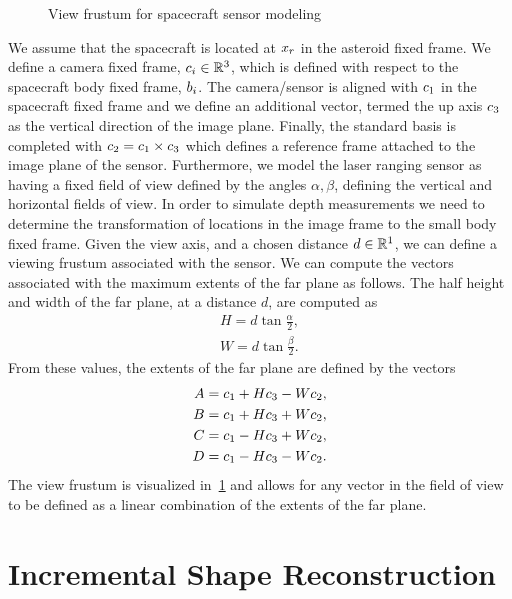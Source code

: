 \documentclass[letterpaper, paper,11pt]{AAS}		%
\begin{document}
\begin{figure}[htbp]
    \centering
    
    \caption{View frustum for spacecraft sensor modeling\label{fig:view_frustrum}}
\end{figure}
We assume that the spacecraft is located at \(x_r\) in the asteroid fixed frame.
We define a camera fixed frame, \( c_i \in \mathbb{R}^3 \), which is defined with respect to the spacecraft body fixed frame, \( b_i \).
The camera/sensor is aligned with \( c_1 \) in the spacecraft fixed frame and we define an additional vector, termed the up axis \( c_3 \) as the vertical direction of the image plane. 
Finally, the standard basis is completed with \(  c_2 = c_1 \times c_3 \) which defines a reference frame attached to the image plane of the sensor.
Furthermore, we model the laser ranging sensor as having a fixed field of view defined by the angles \( \alpha, \beta \), defining the vertical and horizontal fields of view.
In order to simulate depth measurements we need to determine the transformation of locations in the image frame to the small body fixed frame. 
Given the view axis, and a chosen distance \( d  \in \mathbb{R}^1 \), we can define a viewing frustum associated with the sensor. 
We can compute the vectors associated with the maximum extents of the far plane as follows.
The half height and width of the far plane, at a distance \( d \), are computed as
\begin{align*}
    H = d \tan \frac{\alpha}{2} , \\
    W = d \tan \frac{\beta}{2} .
\end{align*}
From these values, the extents of the far plane are defined by the vectors
\begin{align*}
    A = c_1 + H c_3 - W c_2 , \\
    B = c_1 + H c_3 + W c_2, \\
    C = c_1 - H c_3 + W c_2, \\
    D = c_1 - H c_3 - W c_2.
\end{align*}
The view frustum is visualized in~\cref{fig:view_frustrum} and allows for any vector in the field of view to be defined as a linear combination of the extents of the far plane.

\section{Incremental Shape Reconstruction}\label{sec:radius_update}
\end{document}
